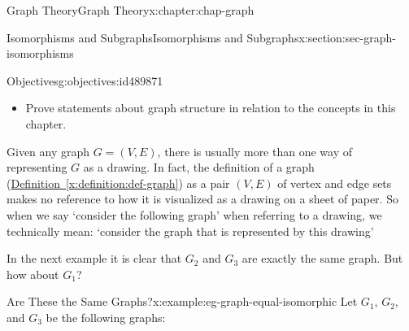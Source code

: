 \documentclass[oneside,10pt,]{book}
\newcommand{\xreffont}{\relax}
\numberwithin{equation}{section}
\begin{document}
\begin{chapterptx}{Graph Theory}{}{Graph Theory}{}{}{x:chapter:chap-graph}
\begin{sectionptx}{Isomorphisms and Subgraphs}{}{Isomorphisms and Subgraphs}{}{}{x:section:sec-graph-isomorphisms}
\begin{objectives}{Objectives}{g:objectives:id489871}
\begin{itemize}[label=\textbullet]
\item{}Prove statements about graph structure in relation to the concepts in this chapter.%
\end{itemize}
\end{objectives}
Given any graph \(G = (V,E)\), there is usually more than one way of representing \(G\) as a drawing. In fact, the definition of a graph (\hyperref[x:definition:def-graph]{Definition~{\xreffont\ref{x:definition:def-graph}}}) as a pair \((V,E)\) of vertex and edge sets makes no reference to how it is visualized as a drawing on a sheet of paper. So when we say `consider the following graph' when referring to a drawing, we technically mean: `consider the graph that is represented by this drawing\textellipsis{}'%
\par
In the next example it is clear that \(G_2\) and \(G_3\) are exactly the same graph. But how about \(G_1\)?%
\begin{example}{Are These the Same Graphs?}{x:example:eg-graph-equal-isomorphic}%
Let \(G_1\), \(G_2\), and \(G_3\) be the following graphs:%
\begin{sidebyside}{3}{0.0666666666666667}{0.0666666666666667}{0.133333333333333}%
\begin{sbspanel}{0.2}%
\end{sbspanel}
\end{sidebyside}
\end{example}
\end{sectionptx}
\end{chapterptx}
\end{document}
